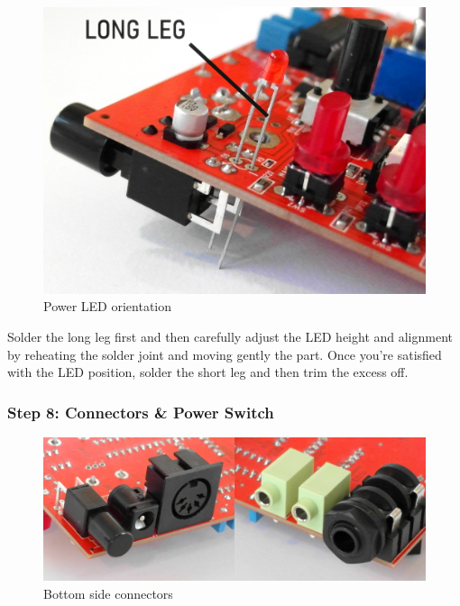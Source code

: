 \documentclass{scrartcl}
\begin{document}
\begin{figure}[!ht]
    \begin{center}
        \includegraphics[scale=0.35]{assets/pcb-led.jpg}
        \caption{Power LED orientation}
    \end{center}
\end{figure}

Solder the long leg first and then carefully adjust the LED height and alignment by reheating the solder joint and moving gently the part.
Once you're satisfied with the LED position, solder the short leg and then trim the excess off.

\subsubsection{Step 8: Connectors \& Power Switch}

\begin{figure}[!ht]
    \begin{center}
        \includegraphics[scale=0.30]{assets/pcb-connectors.jpg}
        \caption{Bottom side connectors}
    \end{center}
\end{figure}
\end{document}
